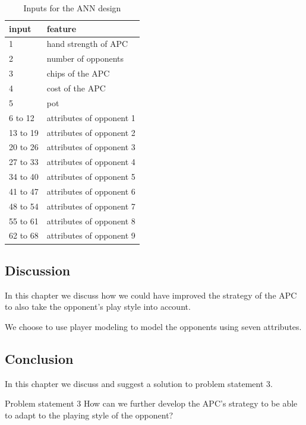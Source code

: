 \begin{table}[H]
\center
\begin{tabular}{ | l | l | }
\hline
input & feature \\
\hline
1 & hand strength of APC\\
2 & number of opponents\\
3 & chips of the APC\\
4 & cost of the APC\\
5 & pot\\
6 to 12 & attributes of opponent 1\\
13 to 19 & attributes of opponent 2\\
20 to 26 & attributes of opponent 3\\
27 to 33 & attributes of opponent 4\\
34 to 40 & attributes of opponent 5\\
41 to 47 & attributes of opponent 6\\
48 to 54 & attributes of opponent 7\\
55 to 61 & attributes of opponent 8\\
62 to 68 & attributes of opponent 9\\
\hline
\end{tabular}
\caption{Inputs for the ANN design \label{tab:ann-design}}
\end{table} 

\subsection{Discussion}
In this chapter we discuss how we could have improved the strategy of the APC to also take the opponent's play style into account. 

We choose to use player modeling to model the opponents using seven attributes. 


\subsection{Conclusion}
In this chapter we discuss and suggest a solution to problem statement 3.

\vspace{4mm}
\begin{statementBox2}{Problem statement 3}
How can we further develop the APC's strategy to be able to adapt to the playing style of the opponent?
\end{statementBox2}
\vspace{4mm} 


